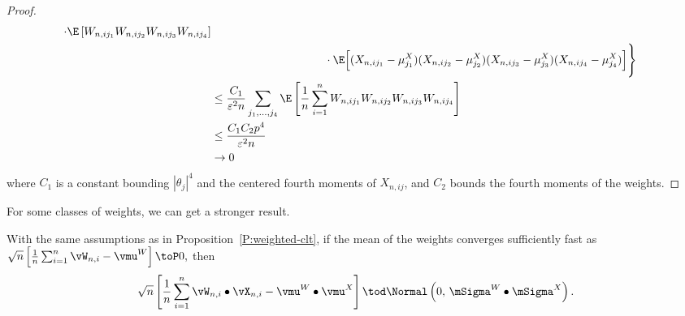 \begin{proof}
\begin{align*}
                 \cdot \E \left[ 
                         W_{n,ij_1}
                         W_{n,ij_2}
                         W_{n,ij_3}
                         W_{n,ij_4}
                     \right] \\
                &\qquad\qquad\qquad\qquad\qquad \cdot \E \Big[ 
                        (X_{n,ij_1} - \mu^X_{j_1})
                        (X_{n,ij_2} - \mu^X_{j_2})
                        (X_{n,ij_3} - \mu^X_{j_3})
                        (X_{n,ij_4} - \mu^X_{j_4})
                    \Big] \Bigg\} \\
        &\leq
            \frac{C_1}{\varepsilon^2 n}
            \sum_{j_1, \ldots, j_4}
                \E \left[
                    \frac{1}{n}
                    \sum_{i=1}^n
                        W_{n,ij_1}
                        W_{n,ij_2}
                        W_{n,ij_3}
                        W_{n,ij_4}
                \right] \\
        &\leq
            \frac{C_1 C_2 p^4}{\varepsilon^2 n} \\
        &\to 0
    \end{align*}
    where $C_1$ is a constant bounding $|\theta_{j}|^4$ and the
    centered fourth moments of $X_{n,ij}$, and $C_2$ bounds the
    fourth moments of the weights.
\end{proof}

For some classes of weights, we can get a stronger result.

\begin{corollary}\label{C:strong-weighted-clt}
    With the same assumptions as in Proposition~\ref{P:weighted-clt},
    if the mean of the weights converges sufficiently fast as
    \(
        \sqrt{n} \left[ \frac{1}{n} \sum_{i=1}^n \vW_{n,i} - \vmu^W \right] 
        \toP 
        0,
    \)
    then
    \[
        \sqrt{n}
        \left[
            \frac{1}{n}
            \sum_{i=1}^n
                \vW_{n,i} \bullet \vX_{n,i}
            -
            \vmu^W \bullet \vmu^X
        \right]
        \tod
        \Normal\left( 0, \, \mSigma^W \bullet \mSigma^X \right).
    \]
\end{corollary}
